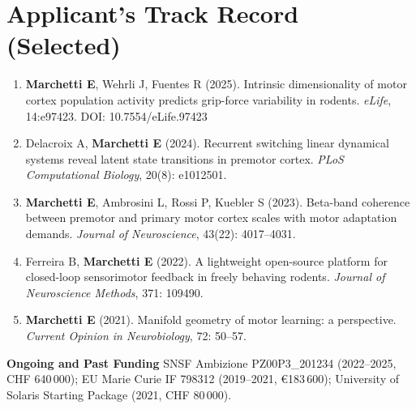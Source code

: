 \section{Applicant's Track Record (Selected)}

\begin{tcolorbox}[snsfbox, title={\faFile\quad Selected Publications (last 5 years)}]
{\small
\begin{enumerate}[leftmargin=*, label=\lbrack\arabic*\rbrack, itemsep=3pt]
  \item \textbf{Marchetti E}, Wehrli J, Fuentes R (2025). Intrinsic dimensionality of motor
    cortex population activity predicts grip-force variability in rodents.
    \textit{eLife}, 14:e97423. DOI: 10.7554/eLife.97423

  \item Delacroix A, \textbf{Marchetti E} (2024). Recurrent switching linear dynamical systems
    reveal latent state transitions in premotor cortex.
    \textit{PLoS Computational Biology}, 20(8): e1012501.

  \item \textbf{Marchetti E}, Ambrosini L, Rossi P, Kuebler S (2023). Beta-band coherence
    between premotor and primary motor cortex scales with motor adaptation demands.
    \textit{Journal of Neuroscience}, 43(22): 4017--4031.

  \item Ferreira B, \textbf{Marchetti E} (2022). A lightweight open-source platform for
    closed-loop sensorimotor feedback in freely behaving rodents.
    \textit{Journal of Neuroscience Methods}, 371: 109490.

  \item \textbf{Marchetti E} (2021). Manifold geometry of motor learning: a perspective.
    \textit{Current Opinion in Neurobiology}, 72: 50--57.
\end{enumerate}
}
\end{tcolorbox}

\vspace{4pt}

\noindent\textbf{Ongoing and Past Funding}\quad
SNSF Ambizione PZ00P3\_201234 (2022--2025, CHF 640\,000);
EU Marie Curie IF 798312 (2019--2021, \euro{}183\,600); University of Solaris Starting
Package (2021, CHF 80\,000).

\vspace{10pt}

